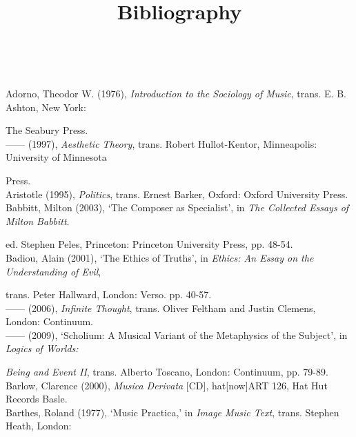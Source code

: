 \paragraph{}
\paragraph{}
\begin{flushleft}
\huge 
\marginpar{}
\title{\textbf{Bibliography}}  
\hypertarget{adornointro}{}\\
\end{flushleft}
\vspace{20pt} 
\normalsize
Adorno, Theodor W. (1976), \emph{Introduction to the Sociology of Music}, trans. E. B. Ashton, New York: 

The Seabury Press. 
\hypertarget{adornoaesth}{}\\
------ (1997), \emph{Aesthetic Theory}, trans. Robert Hullot-Kentor, Minneapolis: University of Minnesota 

Press. 
\hypertarget{aristotle}{}\\
Aristotle (1995), \emph{Politics}, trans. Ernest Barker, Oxford: Oxford University Press. 
\hypertarget{babbitt}{}\\
Babbitt, Milton (2003), `The Composer as Specialist', in \emph{The Collected Essays of Milton Babbitt}.  

ed. Stephen Peles,  Princeton: Princeton University Press, pp. 48-54.
\hypertarget{badiouethics}{}\\
Badiou, Alain (2001), `The Ethics of Truths', in \emph{Ethics: An Essay on the Understanding of Evil}, 

trans. Peter Hallward, London: Verso. pp. 40-57.
\hypertarget{infthought}{}\\
------ (2006), \emph{Infinite Thought}, trans. Oliver Feltham and Justin Clemens, London: Continuum. 
\hypertarget{badioumus}{}\\
------ (2009), `Scholium: A Musical Variant of the Metaphysics of the Subject', in \emph{Logics of Worlds:}

\emph{Being and Event II}, trans. Alberto Toscano, London: Continuum, pp. 79-89. 
\hypertarget{barlow}{}\\
Barlow, Clarence (2000), \emph{Musica Derivata} [CD], hat[now]ART 126, Hat Hut Records Basle. 
\hypertarget{barthes}{}\\
Barthes, Roland (1977), `Music Practica,' in \emph{Image Music Text}, trans. Stephen Heath, London: 

